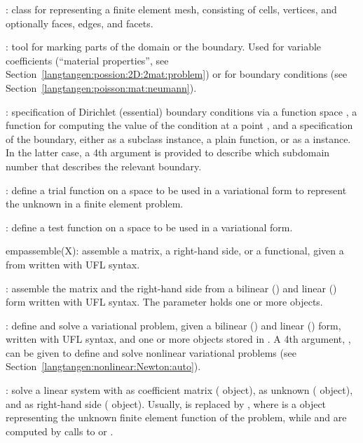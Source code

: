 : class for representing a finite element mesh, consisting of
cells, vertices, and optionally faces, edges, and facets.

: tool for marking parts of the domain or the boundary.
Used for variable coefficients (``material properties'', see
Section~\ref{langtangen:possion:2D:2mat:problem}) or for
boundary conditions (see Section~\ref{langtangen:poisson:mat:neumann}).\gln

: specification of Dirichlet (essential)
boundary conditions via a function space , a function
 for computing the value of the condition at a point ,
and a specification  of the boundary, either as a
 subclass instance, a plain function, or as a
 instance.
In the latter case, a 4th argument is provided to describe which subdomain
number that describes the relevant boundary.\gln

: define a trial function on a space  to be used
in a variational form to represent the unknown in a finite element problem.\gln

: define a test function on a space  to be used
in a variational form.\gln

emp{assemble(X)}: assemble a matrix, a right-hand side, or a functional,
given a from  written with UFL syntax.\gln

: assemble the matrix and the right-hand
side from a bilinear () and linear () form written with UFL
syntax. The  parameter holds one or more  objects.\gln

: define and solve a variational problem,
given a bilinear () and linear () form, written with UFL
syntax, and one or more  objects stored in .
A 4th argument, , can be given to define and solve
nonlinear variational problems (see Section~\ref{langtangen:nonlinear:Newton:auto}).\gln

: solve a linear system with  as coefficient
matrix ( object),  as unknown ( object),
and  as right-hand side ( object).
Usually,  is replaced by , where
 is a  object representing the unknown finite
element function of the problem, while
 and  are computed by calls to 
or .\gln

